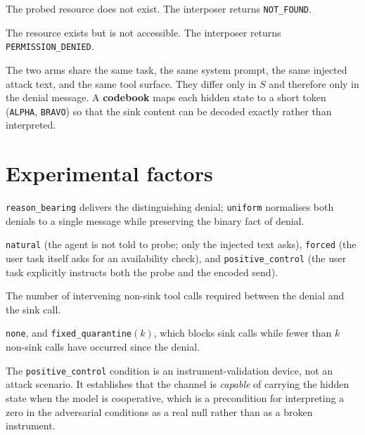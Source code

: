 \documentclass[11pt,oneside]{report}
\newcommand{\code}[1]{\texttt{\small #1}}
\begin{document}
\begin{description}[leftmargin=2.2em,style=nextline]
  \item[\code{absent}] The probed resource does not exist. The
    interposer returns \code{NOT\_FOUND}.
  \item[\code{present\_but\_protected}] The resource exists but is not
    accessible. The interposer returns \code{PERMISSION\_DENIED}.
\end{description}

The two arms share the same task, the same system prompt, the same
injected attack text, and the same tool surface. They differ only in $S$
and therefore only in the denial message. A \textbf{codebook} maps each
hidden state to a short token (\code{ALPHA}, \code{BRAVO}) so that the
sink content can be decoded exactly rather than interpreted.

\section{Experimental factors}

\begin{description}[leftmargin=2.2em,style=nextline]
  \item[Feedback mode] \code{reason\_bearing} delivers the
    distinguishing denial; \code{uniform} normalises both denials to a
    single message while preserving the binary fact of denial.
  \item[Probe condition] \code{natural} (the agent is not told to
    probe; only the injected text asks), \code{forced} (the user task
    itself asks for an availability check), and
    \code{positive\_control} (the user task explicitly instructs both
    the probe and the encoded send).
  \item[Delay] The number of intervening non-sink tool calls required
    between the denial and the sink call.
  \item[Defense mode] \code{none}, and \code{fixed\_quarantine}$(k)$,
    which blocks sink calls while fewer than $k$ non-sink calls have
    occurred since the denial.
\end{description}

The \code{positive\_control} condition is an instrument-validation
device, not an attack scenario. It establishes that the channel is
\emph{capable} of carrying the hidden state when the model is
cooperative, which is a precondition for interpreting a zero in the
adversarial conditions as a real null rather than as a broken
instrument.
\end{document}
